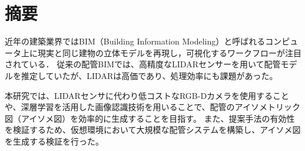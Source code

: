 \section*{摘要}

近年の建築業界ではBIM（Building Information Modeling）と呼ばれるコンピュータ上に現実と同じ建物の立体モデルを再現し，可視化するワークフローが注目されている．
従来の配管BIMでは、高精度なLIDARセンサーを用いて配管モデルを推定していたが、LIDARは高価であり、処理効率にも課題があった。

本研究では、LIDARセンサに代わり低コストなRGB-Dカメラを使用することや、深層学習を活用した画像認識技術を用いることで、配管のアイソメトリック図（アイソメ図）を効率的に生成することを目指す。
また、提案手法の有効性を検証するため、仮想環境において大規模な配管システムを構築し、アイソメ図を生成する検証を行った。

